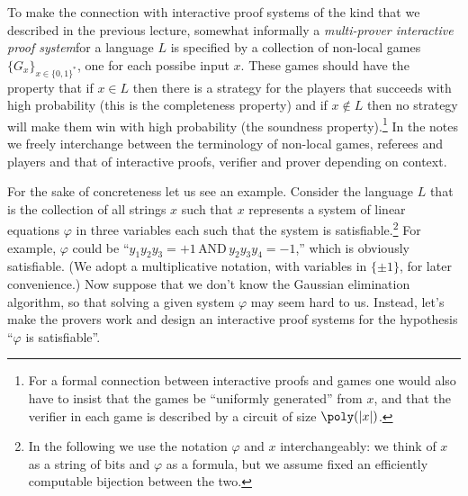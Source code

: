 \begin{remark}
To make the connection with interactive proof systems of the kind that we described in the previous lecture, somewhat informally a \emph{multi-prover interactive proof system}for a language $L$ is specified by a collection of non-local games $\{G_x\}_{x\in\{0,1\}^*}$, one for each possibe input $x$. These games should have the property that if $x\in L$ then there is a strategy for the players that succeeds with high probability (this is the completeness property) and if $x\notin L$ then no strategy will make them win with high probability (the soundness property).\footnote{For a formal connection between interactive proofs and games one would also have to insist that the games be ``uniformly generated'' from $x$, and that the verifier in each game is described by a circuit of size $\poly(|x|)$.} In the notes we freely interchange between the terminology of non-local games, referees and players and that of interactive proofs, verifier and prover depending on context. 
\end{remark}

For the sake of concreteness let us see an example. Consider the language $L$ that is the collection of all strings $x$ such that $x$ represents a system of linear equations  $\varphi$  in three variables each such that the system is satisfiable.\footnote{In the following we use the notation $\varphi$ and $x$ interchangeably: we think of $x$ as a string of bits and $\varphi$ as a formula, but we assume fixed an efficiently computable bijection between the two.} For example, $\varphi$ could be ``$y_1 y_2  y_3 = +1\,\text{AND}\, y_2  y_3  y_4 = -1$,'' which is obviously satisfiable. (We adopt a multiplicative notation, with variables in $\{\pm 1\}$, for later convenience.) Now suppose that we don't know the Gaussian elimination algorithm, so that solving a given system $\varphi$ may seem hard to us. Instead, let's make the provers work and design an interactive proof systems for the hypothesis ``$\varphi$ is satisfiable''. 

